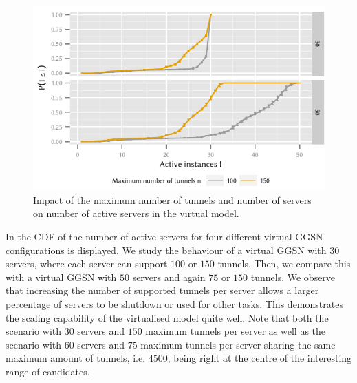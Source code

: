 \begin{figure}
  \centering
  \includegraphics{cloud/virtualized_network_functions/performance_evaluation/figures/instanceuse_multiserver}
  \caption{Impact of the maximum number of tunnels and number of servers on number of active servers in the virtual  model.}
  \label{fig:cloud:virtualized_network_functions:performance_evaluation:virtual_ggsn:instanceuse_multiserver}
\end{figure}

In  the \gls{CDF} of the number of active servers for four different virtual \gls{GGSN} configurations is displayed.
We study the behaviour of a virtual \gls{GGSN} with \(30\) servers, where each server can support \(100\) or \(150\) tunnels.  
Then, we compare this with a virtual \gls{GGSN} with \(50\) servers and again \(75\) or \(150\) tunnels.
We observe that increasing the number of supported tunnels per server allows a larger percentage of servers to be shutdown or used for other tasks. This demonstrates the scaling capability of the virtualised model quite well.
Note that both the scenario with \(30\) servers and \(150\) maximum tunnels per server as well as the scenario with \(60\) servers and \(75\) maximum tunnels per server sharing the same maximum amount of tunnels, i.e. \(4500\), being right at the centre of the interesting range of candidates.

